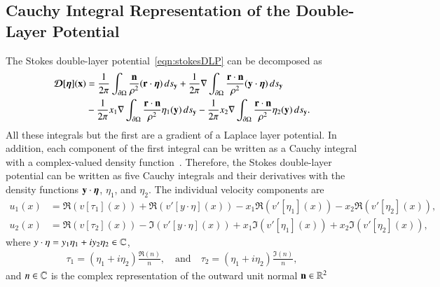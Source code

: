 \documentclass[preprint, 10pt]{elsarticle}
\begin{document}
\subsection{Cauchy Integral Representation of the Double-Layer
Potential}
\label{sec:DLPcomplex}
The Stokes double-layer potential~\eqref{eqn:stokesDLP} can be
decomposed as
\begin{equation}
  \label{eqn:Stokes2Laplace}
  \begin{aligned}
    {\boldsymbol{\mathcal D}}[{\boldsymbol\eta}]({\mathbf{x}}) &= 
      \frac{1}{2\pi} \int_{{\partial}\Omega} 
        \frac{{\mathbf{n}}}{\rho^2} ({\mathbf{r}} \cdot {\boldsymbol\eta}) \, ds_{\mathbf{y}} + 
      \frac{1}{2\pi} \nabla \int_{{\partial}\Omega}
        \frac{{\mathbf{r}} \cdot {\mathbf{n}}}{\rho^2} ({\mathbf{y}} \cdot {\boldsymbol\eta}) \, ds_{\mathbf{y}} \\
      &- \frac{1}{2\pi} x_1 \nabla \int_{{\partial}\Omega}
        \frac{{\mathbf{r}} \cdot {\mathbf{n}}}{\rho^2}\eta_1({\mathbf{y}}) \, ds_{\mathbf{y}} -
      \frac{1}{2\pi} x_2 \nabla \int_{{\partial}\Omega}
        \frac{{\mathbf{r}} \cdot {\mathbf{n}}}{\rho^2}\eta_2({\mathbf{y}}) \, ds_{\mathbf{y}}.
  \end{aligned}
\end{equation}
All these integrals but the first are a gradient of a Laplace layer
potential.  In addition, each component of the first integral can be
written as a Cauchy integral with a complex-valued density
function~\cite{bar-wu-vee2015}.  Therefore, the Stokes double-layer
potential can be written as five Cauchy integrals and their derivatives
with the density functions ${\mathbf{y}} \cdot {\boldsymbol\eta}$, $\eta_1$, and $\eta_2$.
The individual velocity components are
\begin{align}
  \label{eqn:cauchy1}
  u_1(x) &= \Re (v[\tau_1](x)) + \Re (v'[y\cdot\eta](x)) 
           -x_1\Re (v'[\eta_1](x)) - x_2\Re (v'[\eta_2](x)), \\
  u_2(x) &= \Re (v[\tau_2](x)) - \Im (v'[y\cdot\eta](x)) 
       +x_1\Im (v'[\eta_1](x)) + x_2\Im (v'[\eta_2](x)),
\end{align}
where $y \cdot \eta = y_1 \eta_1 + i y_2 \eta_2 \in {\mathbb{C}}$, 
\begin{align} 
  \tau_1=(\eta_1+i\eta_2)\frac{\Re(n)}{n}, \quad \text{and} \quad
  \tau_2=(\eta_1+i\eta_2)\frac{\Im(n)}{n},
\end{align}
and $n \in {\mathbb{C}}$ is the complex representation of the outward unit normal
${\mathbf{n}} \in {\mathbb{R}}^2$

\end{document}
